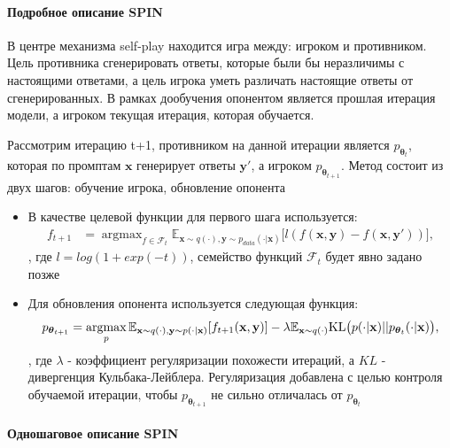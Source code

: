 \documentclass[12pt, twoside]{article}
\newcommand{\bx}{\mathbf{x}}
\newcommand{\by}{\mathbf{y}}
\newcommand{\btheta}{\boldsymbol{\theta}}
\newcommand{\cF}{\mathcal{F}}
\newcommand{\EE}{\mathbb{E}}
\newcommand{\argmax}{\mathop{\mathrm{argmax}}}
\begin{document}
\paragraph{Подробное описание SPIN}

В центре механизма self-play находится игра между: игроком и противником. Цель противника сгенерировать ответы, которые были бы неразличимы с настоящими ответами, а цель игрока уметь различать настоящие ответы от сгенерированных. В рамках дообучения опонентом является прошлая итерация модели, а игроком текущая итерация, которая обучается.

Рассмотрим итерацию t+1, противником на данной итерации является $p_{\btheta_t}$, которая по промптам $\bx$ генерирует ответы $\by'$, а игроком $p_{\btheta_{t+1}}$. Метод состоит из двух шагов: обучение игрока, обновление опонента

\begin{itemize}
    \item В качестве целевой функции для первого шага используется:
    \begin{align}
        f_{t+1} &= \argmax_{f \in \cF_{t}}\EE_{\bx\sim q(\cdot), \by\sim p_{data}(\cdot | \bx)}\big[l(f(\bx, \by) - f(\bx, \by')) \big], \label{eq:f*1}
    \end{align}
    , где $l = log(1 + exp(-t))$, семейство функций $\cF_t$ будет явно задано позже

    \vspace{8}

    \item Для обновления опонента используется следующая функция:
    \begin{align}
        p_{\btheta_{t+1}} = \argmax_ {p}\EE_{\bx \sim q(\cdot), \by\sim p(\cdot|\bx)} [f_{t+1}(\bx, \by)]\notag - \lambda \EE_{\bx\sim q(\cdot)}\mathrm{KL}\big(p(\cdot|\bx)||p_{\btheta_t}(\cdot|\bx)\big), \label{eq: update}
    \end{align} 
    , где $\lambda$ - коэффициент регуляризации похожести итераций, а $KL$ - дивергенция Кульбака-Лейблера. Регуляризация добавлена с целью контроля обучаемой итерации, чтобы $p_\btheta_{t+1}$  не сильно отличалась от $p_\btheta_t$
    
    
\end{itemize}

\paragraph{Одношаговое описание SPIN}
\end{document}
